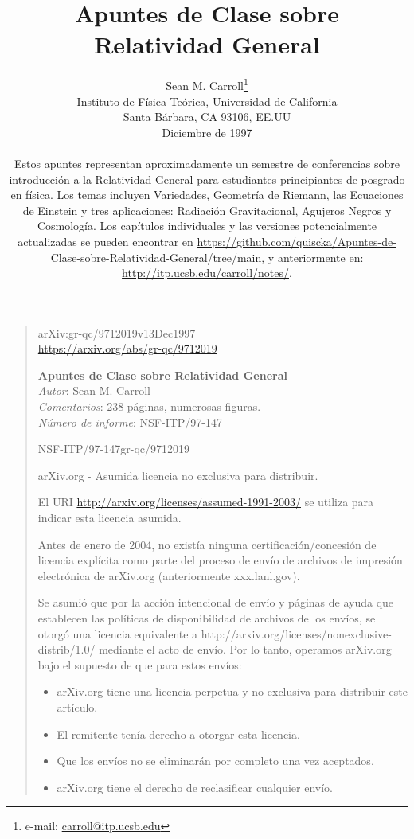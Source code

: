 \documentclass[11pt,b5paper,openany,twoside]{book}
\title{\textcolor{GrisAzul}{{\Huge \textbf{Apuntes de Clase sobre\\[6mm] Relatividad General}}}}
\author{Sean M. Carroll\hspace{2pt}\thanks{e-mail: \href{carroll@itp.ucsb.edu}{carroll@itp.ucsb.edu}} \\[14mm]
Instituto de Física Teórica, Universidad de California \\
Santa Bárbara, CA 93106, EE.UU \\[2mm]
Diciembre de 1997 \\[10mm]
\parbox{10.6cm}{Estos apuntes representan aproximadamente un semestre de conferencias sobre introducción a la Relatividad General para estudiantes principiantes de posgrado en física.
Los temas incluyen Variedades, Geometría de Riemann, las Ecuaciones de Einstein y tres aplicaciones: Radiación Gravitacional, Agujeros Negros y Cosmología.
Los capítulos individuales y las versiones potencialmente actualizadas se pueden encontrar en
\href{https://github.com/quiscka/Apuntes-de-Clase-sobre-Relatividad-General/tree/main}{https://github.com/quiscka/Apuntes-de-Clase-sobre-Relatividad-General/tree/main}, y anteriormente en:
 \href{http://itp.ucsb.edu/carroll/notes/}{http://itp.ucsb.edu/carroll/notes/}.}
}
\date{}
\begin{document}
\thispagestyle{plain}

\frontmatter

\maketitle

\begin{quote}
{\footnotesize
\noindent
arXiv:gr-qc/9712019v13Dec1997 \\ \href{https://arxiv.org/abs/gr-qc/9712019}{https://arxiv.org/abs/gr-qc/9712019}

\noindent
\textbf{Apuntes de Clase sobre Relatividad General}\\
\textit{Autor}: Sean M. Carroll \\
\textit{Comentarios}: 238 páginas, numerosas figuras. \\
\textit{Número de informe}: NSF-ITP/97-147

{{NSF-ITP/97-147}\hfill{gr-qc/9712019}}


arXiv.org - Asumida licencia no exclusiva para distribuir.

El URI \href{http://arxiv.org/licenses/assumed-1991-2003/}{http://arxiv.org/licenses/assumed-1991-2003/} se utiliza para indicar esta licencia asumida.

Antes de enero de 2004, no existía ninguna certificación/concesión de licencia explícita como parte del proceso de envío de archivos de impresión electrónica de arXiv.org (anteriormente xxx.lanl.gov).

Se asumió que por la acción intencional de envío y páginas de ayuda que establecen las políticas de disponibilidad de archivos de los envíos, se otorgó una licencia equivalente a http://arxiv.org/licenses/nonexclusive-distrib/1.0/ mediante el acto de envío. Por lo tanto, operamos arXiv.org bajo el supuesto de que para estos envíos:

\begin{itemize}
\item arXiv.org tiene una licencia perpetua y no exclusiva para distribuir este artículo.
\item El remitente tenía derecho a otorgar esta licencia.
\item Que los envíos no se eliminarán por completo una vez aceptados.
\item arXiv.org tiene el derecho de reclasificar cualquier envío.
\end{itemize}

}
\end{quote}
\end{document}
